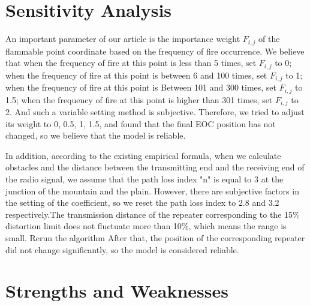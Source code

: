 \documentclass{mcmthesis}
\begin{document}
\section{Sensitivity Analysis}
An important parameter of our article is the importance weight  $F_{i,j}$ of the flammable point coordinate based on the frequency of fire occurrence. We believe that when the frequency of fire at this point is less than 5 times, set $F_{i,j}$ to 0; when the frequency of fire at this point is between 6 and 100 times, set  $F_{i,j}$ to 1; when the frequency of fire at this point is Between 101 and 300 times, set  $F_{i,j}$ to 1.5; when the frequency of fire at this point is higher than 301 times, set  $F_{i,j}$ to 2. And such a variable setting method is subjective. Therefore, we tried to adjust its weight to 0, 0.5, 1, 1.5, and found that the final EOC position has not changed, so we believe that the model is reliable.

In addition, according to the existing empirical formula, when we calculate obstacles and the distance between the transmitting end and the receiving end of the radio signal, we assume that the path loss index "n" is equal to 3 at the junction of the mountain and the plain. However, there are subjective factors in the setting of the coefficient, so we reset the path loss index to 2.8 and 3.2 respectively.The transmission distance of the repeater corresponding to the 15\% distortion limit does not fluctuate more than 10\%, which means the range is small. Rerun the algorithm After that, the position of the corresponding repeater did not change significantly, so the model is considered reliable.
\section{Strengths and Weaknesses}
\end{document}
